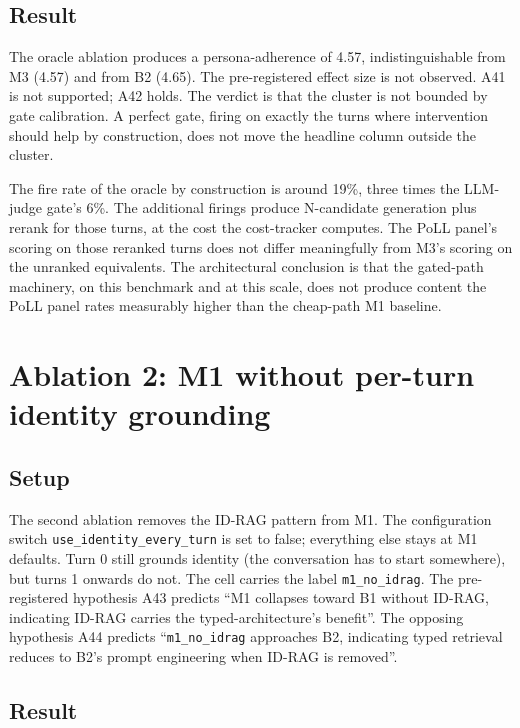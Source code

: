 \subsection{Result}

The oracle ablation produces a persona-adherence of 4.57, indistinguishable from M3 (4.57) and from B2 (4.65). The pre-registered effect size is not observed. A41 is not supported; A42 holds. The verdict is that the cluster is not bounded by gate calibration. A perfect gate, firing on exactly the turns where intervention should help by construction, does not move the headline column outside the cluster.

The fire rate of the oracle by construction is around 19\%, three times the LLM-judge gate's 6\%. The additional firings produce N-candidate generation plus rerank for those turns, at the cost the cost-tracker computes. The PoLL panel's scoring on those reranked turns does not differ meaningfully from M3's scoring on the unranked equivalents. The architectural conclusion is that the gated-path machinery, on this benchmark and at this scale, does not produce content the PoLL panel rates measurably higher than the cheap-path M1 baseline.

\section{Ablation 2: M1 without per-turn identity grounding}
\label{sec:m1-no-idrag}

\subsection{Setup}

The second ablation removes the ID-RAG pattern from M1. The configuration switch \texttt{use\_identity\_every\_turn} is set to false; everything else stays at M1 defaults. Turn 0 still grounds identity (the conversation has to start somewhere), but turns 1 onwards do not. The cell carries the label \texttt{m1\_no\_idrag}. The pre-registered hypothesis A43 predicts ``M1 collapses toward B1 without ID-RAG, indicating ID-RAG carries the typed-architecture's benefit''. The opposing hypothesis A44 predicts ``\texttt{m1\_no\_idrag} approaches B2, indicating typed retrieval reduces to B2's prompt engineering when ID-RAG is removed''.

\subsection{Result}


